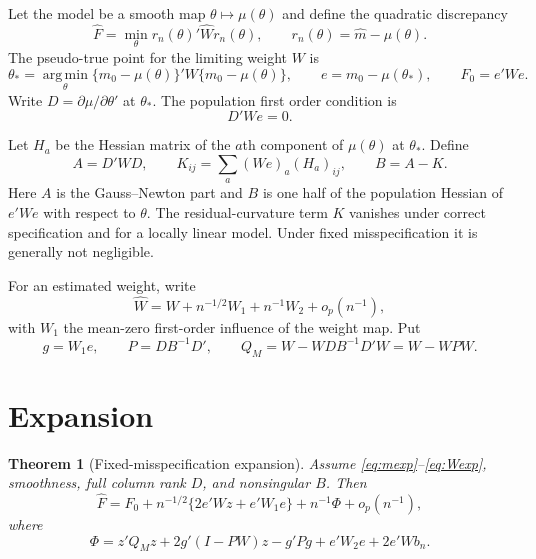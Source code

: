\documentclass[11pt]{article}
\newcommand{\argmin}{\operatorname*{arg\,min}}
\theoremstyle{plain}
\newtheorem{theorem}{Theorem}
\theoremstyle{remark}
\begin{document}
Let the model be a smooth map $\theta\mapsto\mu(\theta)$ and define the
quadratic discrepancy
\begin{equation}\label{eq:Fhat}
  \hat F
  =
  \min_\theta
  r_n(\theta)'\hat W r_n(\theta),
  \qquad
  r_n(\theta)=\hat m-\mu(\theta).
\end{equation}
The pseudo-true point for the limiting weight $W$ is
\begin{equation}\label{eq:pseudotrue}
  \theta_\ast
  =
  \argmin_\theta
  \{m_0-\mu(\theta)\}'W\{m_0-\mu(\theta)\},
  \qquad
  e=m_0-\mu(\theta_\ast),
  \qquad
  F_0=e'We .
\end{equation}
Write $D=\partial\mu/\partial\theta'$ at $\theta_\ast$. The population first
order condition is
\begin{equation}\label{eq:foc}
  D'We=0 .
\end{equation}

Let $H_a$ be the Hessian matrix of the $a$th component of $\mu(\theta)$ at
$\theta_\ast$. Define
\begin{equation}\label{eq:ABK}
  A = D'WD,
  \qquad
  K_{ij} = \sum_a (We)_a (H_a)_{ij},
  \qquad
  B=A-K .
\end{equation}
Here $A$ is the Gauss--Newton part and $B$ is one half of the population Hessian
of $e'We$ with respect to $\theta$. The residual-curvature term $K$ vanishes
under correct specification and for a locally linear model. Under fixed
misspecification it is generally not negligible.

For an estimated weight, write
\begin{equation}\label{eq:Wexp}
  \hat W
  =
  W + n^{-1/2} W_1 + n^{-1} W_2 + o_p(n^{-1}),
\end{equation}
with $W_1$ the mean-zero first-order influence of the weight map. Put
\begin{equation}\label{eq:g}
  g=W_1e,
  \qquad
  P=DB^{-1}D',
  \qquad
  Q_M = W-WDB^{-1}D'W = W-WPW .
\end{equation}

\section{Expansion}

\begin{theorem}[Fixed-misspecification expansion]\label{thm:expansion}
Assume \eqref{eq:mexp}--\eqref{eq:Wexp}, smoothness, full column rank $D$, and
nonsingular $B$. Then
\begin{equation}\label{eq:Fexp}
  \hat F
  =
  F_0
  + n^{-1/2}\{2e'Wz + e'W_1e\}
  + n^{-1}\Phi
  + o_p(n^{-1}),
\end{equation}
where
\begin{equation}\label{eq:Phi}
  \Phi
  =
  z'Q_M z
  + 2g'(I-PW)z
  - g'Pg
  + e'W_2e
  + 2e'Wb_n .
\end{equation}
\end{theorem}
\end{document}
